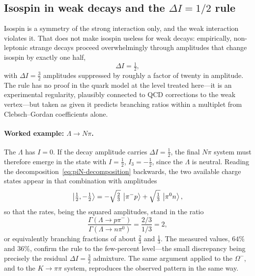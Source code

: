\subsection{Isospin in weak decays and the \texorpdfstring{$\Delta I = 1/2$}{Delta I = 1/2} rule}
\label{subsec:deltaI-half}

Isospin is a symmetry of the strong interaction only, and the weak interaction violates
it. That does not make isospin useless for weak decays: empirically, non-leptonic strange
decays proceed overwhelmingly through amplitudes that change isospin by exactly one half,
\begin{equation}
    \Delta I = \tfrac12 ,
    \label{eq:deltaI-half}
\end{equation}
with $\Delta I = \tfrac32$ amplitudes suppressed by roughly a factor of twenty in
amplitude. The rule has no proof in the quark model at the level treated here---it is an
experimental regularity, plausibly connected to QCD corrections to the weak
vertex---but taken as given it predicts branching ratios within a multiplet from
Clebsch--Gordan coefficients alone.

\paragraph{Worked example: $\Lambda \to N\pi$.}
The $\Lambda$ has $I = 0$. If the decay amplitude carries $\Delta I = \tfrac12$, the final
$N\pi$ system must therefore emerge in the state with $I = \tfrac12$, $I_{3} = -\tfrac12$,
since the $\Lambda$ is neutral. Reading the decomposition~\eqref{eq:piN-decomposition}
backwards, the two available charge states appear in that combination with amplitudes
\begin{equation}
    \ket{\tfrac12,-\tfrac12}
    = -\sqrt{\tfrac23}\,\ket{\pi^{-}p} + \sqrt{\tfrac13}\,\ket{\pi^{0}n},
    \label{eq:lambda-final-state}
\end{equation}
so that the rates, being the squared amplitudes, stand in the ratio
\begin{equation}
    \frac{\Gamma(\Lambda\to p\pi^{-})}{\Gamma(\Lambda\to n\pi^{0})}
    = \frac{2/3}{1/3} = 2 ,
    \label{eq:lambda-ratio}
\end{equation}
or equivalently branching fractions of about $\tfrac23$ and $\tfrac13$. The measured
values, $64\%$ and $36\%$, confirm the rule to the few-percent level---the small
discrepancy being precisely the residual $\Delta I = \tfrac32$ admixture. The same
argument applied to the $\Omega^{-}$, and to the $K \to \pi\pi$ system, reproduces the
observed pattern in the same way.

